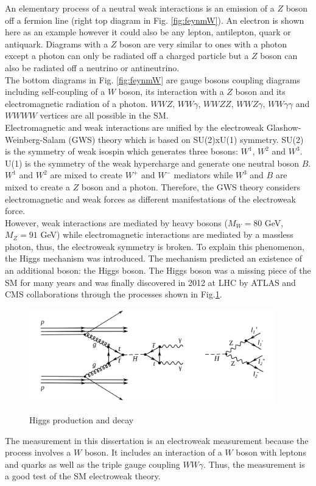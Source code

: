 An elementary process of a neutral weak interactions is an emission of a $Z$ boson off a fermion line (right top diagram in Fig. \ref{fig:feynmW}). An electron is shown here as an example however it could also be any lepton, antilepton, quark or antiquark. Diagrams with a $Z$ boson are very similar to ones with a photon except a photon can only be radiated off a charged particle but a $Z$ boson can also be radiated off a neutrino or antineutrino.\\

The bottom diagrams in Fig. \ref{fig:feynmW} are gauge bosons coupling diagrams including self-coupling of a $W$ boson, its interaction with a $Z$ boson and its electromagnetic radiation of a photon. $WWZ$, $WW\gamma$, $WWZZ$, $WWZ\gamma$, $WW\gamma\gamma$ and $WWWW$ vertices are all possible in the SM.\\

Electromagnetic and weak interactions are unified by the electroweak Glashow-Weinberg-Salam (GWS) theory which is based on SU(2)xU(1) symmetry. SU(2) is the symmetry of weak isospin which generates three bosons: $W^1$, $W^2$ and $W^3$. U(1) is the symmetry of the weak hypercharge and generate one neutral boson $B$. $W^1$ and $W^2$ are mixed to create $W^+$ and $W^-$ mediators while $W^3$ and $B$ are mixed to create a $Z$ boson and a photon. Therefore, the GWS theory considers electromagnetic and weak forces as different manifestations of the electroweak force. \\

However, weak interactions are mediated by heavy bosons ($M_W=80$ GeV, $M_Z=91$ GeV) while electromagnetic interactions are mediated by a massless photon, thus, the electroweak symmetry is broken. To explain this phenomenon, the Higgs mechanism was introduced. The mechanism predicted an existence of an additional boson: the Higgs boson. The Higgs boson was a missing piece of the SM for many years and was finally discovered in 2012 at LHC by ATLAS and CMS collaborations through the processes shown in Fig.\ref{fig:higgsProduction}.\\ 

\begin{figure}[htb]
  \begin{center}
    {\includegraphics[width=0.95\textwidth]{../figs/Intro/FeynmanHiggs.png}}
    \caption{Higgs production and decay}
    \label{fig:higgsProduction}
  \end{center}
\end{figure}

The measurement in this dissertation is an electroweak measurement because the process involves a $W$ boson. It includes an interaction of a $W$ boson with leptons and quarks as well as the triple gauge coupling $WW\gamma$. Thus, the measurement is a good test of the SM electroweak theory.\\ 



